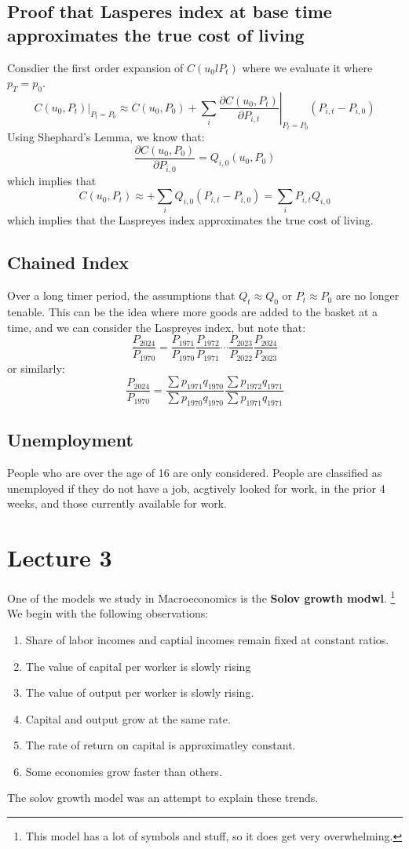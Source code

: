 \documentclass[11pt]{article}
\begin{document}
\subsection{Proof that Lasperes index at base time approximates the true cost of living}
Consdier the first order expansion of $C(u_0l P_t)$ where we evaluate it where $p_T = p_0$. 
\[
C(u_0, P_t)\big|_{P_t = P_0} \approx C(u_0, P_0) + \sum_i \left. \frac{\partial C(u_0, P_t)}{\partial P_{i,t}} \right|_{P_t = P_0} (P_{i,t} - P_{i,0})
\]
Using Shephard's Lemma, we know that:
\[
\frac{\partial C(u_0, P_0)}{\partial P_{i, 0}} = Q_{i,0}(u_0,P_0)
\]
which implies that 
\[
C(u_0, P_t) \approx + \sum_i Q_{i,0} (P_{i,t} - P_{i,0}) = \sum_i P_{i,t} Q_{i,0}
\]
which implies that the Laspreyes index approximates the true cost of living. 
\subsection{Chained Index}
Over a long timer period, the assumptions that $Q_t \approx Q_0$ or $P_t \approx P_0$ are no longer tenable. This can be the idea where more goods are added to the basket at a time, and we can consider the Laspreyes index, but note that:
\[
\frac{P_{2024}}{P_{1970}} = \frac{P_{1971}}{P_{1970}} \frac{P_{1972}}{P_{1971}} \cdots \frac{P_{2023}}{P_{2022}} \frac{P_{2024}}{P_{2023}}
\]
or similarly:
\[
\frac{P_{2024}}{P_{1970}} = \frac{\sum p_{1971}q_{1970}}{\sum p_{1970}q_{1970}} \frac{\sum p_{1972} q_{1971}}{\sum p_{1971} q_{1971}}
\]
\subsection{Unemployment}
People who are over the age of 16 are only considered. People are classified as unemployed if they do not have a job, acgtively looked for work, in the prior 4 weeks, and those currently available for work. 
\section{Lecture 3}
One of the models we study in Macroeconomics is the \textbf{Solov growth modwl}. \footnote{This model has a lot of symbols and stuff, so it does get very overwhelming.} We begin with the following observations:
\begin{enumerate}
    \item Share of labor incomes and captial incomes remain fixed at constant ratios. 
    \item The value of capital per worker is slowly rising 
    \item The value of output per worker is slowly rising. 
    \item Capital and output grow at the same rate. 
    \item The rate of return on capital is approximatley constant. 
    \item Some economies grow faster than others. 
\end{enumerate}
The solov growth model was an attempt to explain these trends.
\end{document}
